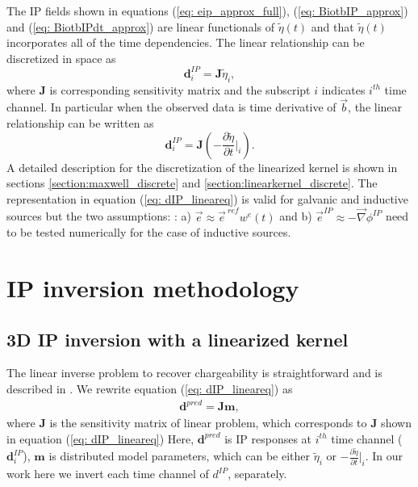 \documentclass[a4paper, 11pt]{article}
\newcommand{\grad}{\vec \nabla}
\renewcommand {\b}  { {\vec b} }
\newcommand {\e}  { {\vec e} }
\newcommand{\peta}{\tilde{\eta}}
\newcommand{\eref}{\e^{\ ref}}
\begin{document}
The IP fields shown in equations (\ref{eq: eip_approx_full}), (\ref{eq: BiotbIP_approx}) and (\ref{eq: BiotbIPdt_approx}) are linear functionals of $\peta(t)$ and that $\peta(t)$ incorporates all of the time dependencies. The linear relationship can be discretized in space as
\begin{equation}
  \mathbf{d}^{IP}_i = \mathbf{J}\peta_i,
  \label{eq: dIP_lineareq}
\end{equation}
where $\mathbf{J}$ is corresponding sensitivity matrix and the subscript $i$ indicates $i^{th}$ time channel. 
In particular when the observed data is time derivative of $\b$, the linear relationship can be written as 
\begin{equation}
  \mathbf{d}^{IP}_i = \mathbf{J}(-\frac{\partial \peta}{\partial t}\Big|_i).
  \label{eq: dIP_lineareq_dbdt}
\end{equation}
A detailed description for the discretization of the linearized kernel is shown in sections \ref{section:maxwell_discrete} and \ref{section:linearkernel_discrete}. 
The representation in equation (\ref{eq: dIP_lineareq}) is valid for galvanic and inductive sources but the two assumptions: : a) $\e \approx \eref w^e(t)$ and b) $\e^{IP} \approx -\grad\phi^{IP}$ need to be tested numerically for the case of inductive sources. 


\section{IP inversion methodology}

\subsection{3D IP inversion with a linearized kernel}
The linear inverse problem to recover chargeability is straightforward and is described in \cite{doug1994}. 
We rewrite equation (\ref{eq: dIP_lineareq}) as
\begin{eqnarray}
  \mathbf{d}^{pred} = \mathbf{J}\mathbf{m},
  \label{eq9}
\end{eqnarray}
where $\mathbf{J}$ is the  sensitivity matrix of linear problem, which corresponds to $\mathbf{J}$ shown in equation (\ref{eq: dIP_lineareq}) 
Here, $\mathbf{d}^{pred}$ is IP responses at $i^{th}$ time channel ($\mathbf{d}^{IP}_i$), $\mathbf{m}$ is distributed model parameters, which can be either $\peta_{i}$ or $-\frac{\partial \peta}{\partial t}\big|_i$. 
In our work here we invert each time channel of $d^{IP}$, separately. 
\end{document}
